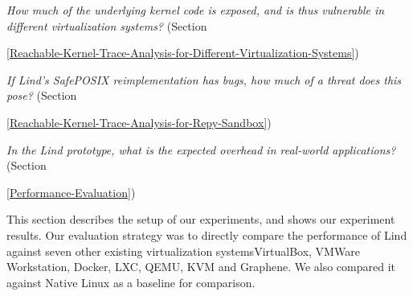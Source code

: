 \textit{How much of the underlying kernel code is exposed, and is thus
vulnerable in different virtualization systems?}
(Section~{{\ref{Reachable-Kernel-Trace-Analysis-for-Different-Virtualization-Systems}})

\textit{If Lind's SafePOSIX reimplementation has bugs, how much of a threat does this pose?}
(Section~{{\ref{Reachable-Kernel-Trace-Analysis-for-Repy-Sandbox}})

\textit{In the Lind prototype, what is the expected overhead in
real-world applications?}
(Section~{{\ref{Performance-Evaluation}})

This section describes the setup of our experiments, 
and shows our experiment results. 
%
%
Our evaluation strategy was to directly compare the performance of Lind
against
seven other existing virtualization systems\textendash VirtualBox, VMWare
Workstation,
Docker, LXC, QEMU, KVM and Graphene. 
We also compared it against Native Linux as a baseline for comparison. 



}}}
